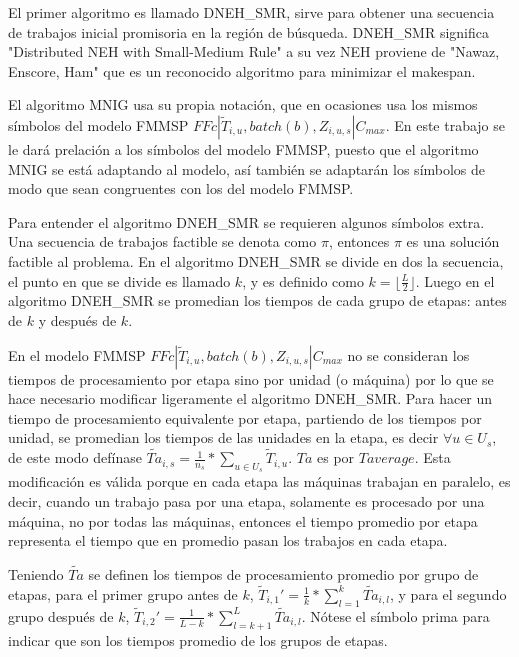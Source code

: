 \documentclass{article}
\def\notac_modelo{$FFc | \tilde{T}_{i, u}, batch(b), Z_{i, u, s} | C_{max}$}
\begin{document}
\vspace{\baselineskip}
El primer algoritmo es llamado DNEH\_SMR, sirve para obtener una secuencia de trabajos inicial promisoria en la región de búsqueda. DNEH\_SMR significa "Distributed NEH with Small-Medium Rule" a su vez NEH proviene de "Nawaz, Enscore, Ham" que es un reconocido algoritmo para minimizar el makespan. \autocite{algMNIG}

\vspace{\baselineskip}
El algoritmo MNIG usa su propia notación, que en ocasiones usa los mismos símbolos del modelo FMMSP \notac_modelo. En este trabajo se le dará prelación a los símbolos del modelo FMMSP, puesto que el algoritmo MNIG se está adaptando al modelo, así también se adaptarán los símbolos de modo que sean congruentes con los del modelo FMMSP.

\vspace{\baselineskip}
Para entender el algoritmo DNEH\_SMR se requieren algunos símbolos extra. Una secuencia de trabajos factible se denota como $\pi$, entonces $\pi$ es una solución factible al problema. En el algoritmo DNEH\_SMR se divide en dos la secuencia, el punto en que se divide es llamado $k$, y es definido como $k = \lfloor\frac{L}{2}\rfloor$. Luego en el algoritmo DNEH\_SMR se promedian los tiempos de cada grupo de etapas: antes de $k$ y después de $k$. \autocite{algMNIG}

\vspace{\baselineskip}
En el modelo FMMSP \notac_modelo no se consideran los tiempos de procesamiento por etapa sino por unidad (o máquina) por lo que se hace necesario modificar ligeramente el algoritmo DNEH\_SMR. Para hacer un tiempo de procesamiento equivalente por etapa, partiendo de los tiempos por unidad, se promedian los tiempos de las unidades en la etapa, es decir $\forall u \in U_{s}$, de este modo defínase $\widetilde{Ta}_{i,s} = \frac{1}{n_s} *\sum_{u \in U_{s}} \widetilde{T}_{i,u}$. $Ta$ es por $T average$. Esta modificación es válida porque en cada etapa las máquinas trabajan en paralelo, es decir, cuando un trabajo pasa por una etapa, solamente es procesado por una máquina, no por todas las máquinas, entonces el tiempo promedio por etapa representa el tiempo que en promedio pasan los trabajos en cada etapa.

\vspace{\baselineskip}
Teniendo $\widetilde{Ta}$ se definen los tiempos de procesamiento promedio por grupo de etapas, para el primer grupo antes de $k$, $\widetilde{T}_{i,1}' = \frac{1}{k}*\sum_{l=1}^{k} \widetilde{Ta}_{i,l}$, y para el segundo grupo después de $k$, $\widetilde{T}_{i,2}' = \frac{1}{L-k}*\sum_{l = k+1}^{L} \widetilde{Ta}_{i,l}$. Nótese el símbolo prima para indicar que son los tiempos promedio de los grupos de etapas. \autocite{algMNIG}
\end{document}
